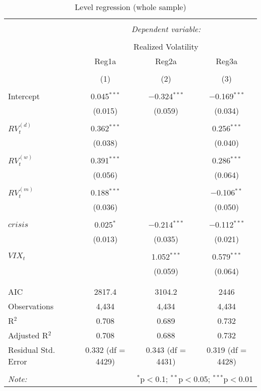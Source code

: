 
\begin{table}[!htbp] \centering 
  \caption{Level regression (whole sample)} 
  \label{tab:newey1} 
\begin{tabular}{@{\extracolsep{5pt}}lccc} 
\\[-1.8ex]\hline 
\hline \\[-1.8ex] 
 & \multicolumn{3}{c}{\textit{Dependent variable:}} \\ 
\cline{2-4} 
\\[-1.8ex] & \multicolumn{3}{c}{Realized Volatility} \\ 
 & Reg1a & Reg2a & Reg3a \\ 
\\[-1.8ex] & (1) & (2) & (3)\\ 
\hline \\[-1.8ex] 
 Intercept & 0.045$^{***}$ & $-$0.324$^{***}$ & $-$0.169$^{***}$ \\ 
  & (0.015) & (0.059) & (0.034) \\ 
  & & & \\ 
 $RV^{(d)}_{t}$ & 0.362$^{***}$ &  & 0.256$^{***}$ \\ 
  & (0.038) &  & (0.040) \\ 
  & & & \\ 
 $RV^{(w)}_{t}$ & 0.391$^{***}$ &  & 0.286$^{***}$ \\ 
  & (0.056) &  & (0.064) \\ 
  & & & \\ 
 $RV^{(m)}_{t}$ & 0.188$^{***}$ &  & $-$0.106$^{**}$ \\ 
  & (0.036) &  & (0.050) \\ 
  & & & \\ 
 $crisis$ & 0.025$^{*}$ & $-$0.214$^{***}$ & $-$0.112$^{***}$ \\ 
  & (0.013) & (0.035) & (0.021) \\ 
  & & & \\ 
 $VIX_{t}$ &  & 1.052$^{***}$ & 0.579$^{***}$ \\ 
  &  & (0.059) & (0.064) \\ 
  & & & \\ 
\hline \\[-1.8ex] 
AIC & 2817.4 & 3104.2 & 2446 \\ 
Observations & 4,434 & 4,434 & 4,434 \\ 
R$^{2}$ & 0.708 & 0.689 & 0.732 \\ 
Adjusted R$^{2}$ & 0.708 & 0.688 & 0.732 \\ 
Residual Std. Error & 0.332 (df = 4429) & 0.343 (df = 4431) & 0.319 (df = 4428) \\ 
\hline 
\hline \\[-1.8ex] 
\textit{Note:}  & \multicolumn{3}{r}{$^{*}$p$<$0.1; $^{**}$p$<$0.05; $^{***}$p$<$0.01} \\ 
\end{tabular} 
\end{table} 
